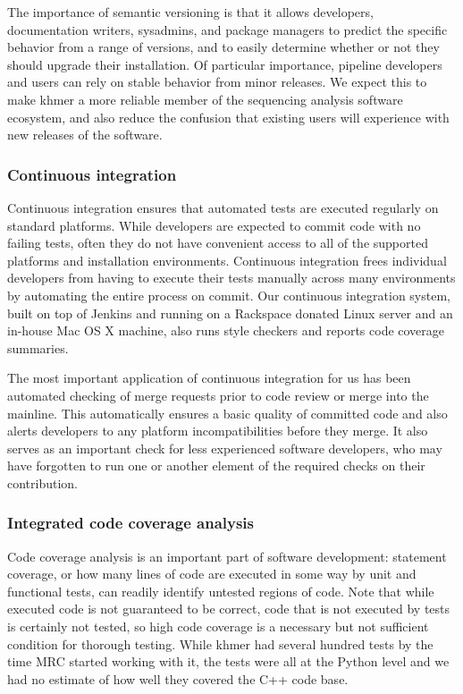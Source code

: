 \documentclass[12pt]{article}
\begin{document}
The importance of semantic versioning is that it allows developers,
documentation writers, sysadmins, and package managers to predict the
specific behavior from a range of versions, and to easily determine
whether or not they should upgrade their installation.  Of particular
importance, pipeline developers and users can rely on stable behavior
from minor releases.  We expect this to make khmer a more reliable
member of the sequencing analysis software ecosystem, and also reduce
the confusion that existing users will experience with new releases of
the software.

\subsubsection{Continuous integration}

Continuous integration ensures that automated tests are executed
regularly on standard platforms.  While developers are expected to
commit code with no failing tests, often they do not have convenient
access to all of the supported platforms and installation
environments.  Continuous integration frees individual developers from
having to execute their tests manually across many environments by
automating the entire process on commit.  Our continuous integration
system, built on top of Jenkins and running on a Rackspace donated
Linux server and an in-house Mac OS X machine, also runs style
checkers and reports code coverage summaries.

The most important application of continuous integration for us has
been automated checking of merge requests prior to code review or
merge into the mainline.  This automatically ensures a basic quality
of committed code and also alerts developers to any platform
incompatibilities before they merge.  It also serves as an important
check for less experienced software developers, who may have forgotten
to run one or another element of the required checks on their
contribution.


\subsubsection{Integrated code coverage analysis}

Code coverage analysis is an important part of software development:
statement coverage, or how many lines of code are executed in some way
by unit and functional tests, can readily identify untested regions of
code.  Note that while executed code is not guaranteed to be correct,
code that is not executed by tests is certainly not tested, so high
code coverage is a necessary but not sufficient condition for thorough
testing.  While khmer had several hundred tests by the time MRC
started working with it, the tests were all at the Python level and we
had no estimate of how well they covered the C++ code base.
\end{document}

